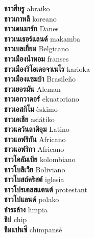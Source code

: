 \textbf{ ชาวฮีบรู  } abraiko \\
\textbf{ ชาวเกาหลี  } koreano \\
\textbf{ ชาวเดนมาร์ก  } Danes \\
\textbf{ ชาวเนเธอร์แลนด์  } makamba \\
\textbf{ ชาวเบลเยี่ยม  } Belgicano \\
\textbf{ ชาวเมืองน้ำหอม  } franses \\
\textbf{ ชาวเมืองริโอเดอจาเนโร  } karioka \\
\textbf{ ชาวเมืองแซมบ้า  } Brasileño \\
\textbf{ ชาวเยอรมัน  } Aleman \\
\textbf{ ชาวเอกวาดอร์  } ekuatoriano \\
\textbf{ ชาวเอสกิโม  } èskimo \\
\textbf{ ชาวเอเชีย  } asiátiko \\
\textbf{ ชาวแคว้นลาติอุม  } Latino \\
\textbf{ ชาวแอฟริกัน  } Africano \\
\textbf{ ชาวแอฟริกา  } Africano \\
\textbf{ ชาวโคลัมเบีย  } kolombiano \\
\textbf{ ชาวโบลิเวีย  } Boliviano \\
\textbf{ ชาวโบสถ์คริสต์  } iglesia \\
\textbf{ ชาวโปรเตสสแตนต์  } protestant \\
\textbf{ ชาวโปแลนด์  } polako \\
\textbf{ ชำระล้าง  } limpia \\
\textbf{ ชิป  } chip \\
\textbf{ ชิมแปนซี  } chimpansé \\
